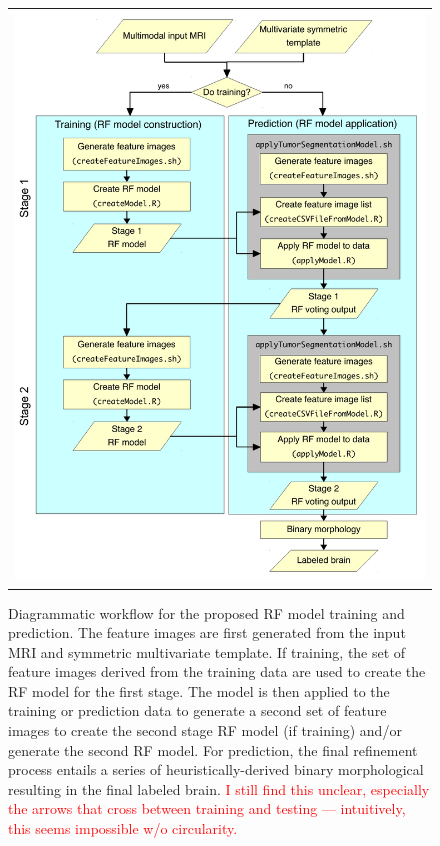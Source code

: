 \documentclass[preprint,authoryear,review,12pt]{elsarticle}
\begin{document}
\begin{figure}
  \centering
  \begin{tabular}{c}
    \includegraphics[width=110mm]{pipeline2.pdf}
  \end{tabular}
  \caption{Diagrammatic workflow for the proposed RF model training and prediction.  The feature
  images are first generated from the input MRI and symmetric multivariate template. If training,
  the set of feature images derived from the training data are used to create the RF model
  for the first stage.  The model is then applied to the training or prediction data to generate 
  a second set of feature images to create the second stage RF model (if training) and/or generate
  the second RF model.  
  For prediction, the final refinement process entails a series of heuristically-derived
  binary morphological resulting in the final labeled brain.
  \textcolor{red}{I still find this unclear, especially the arrows
    that cross between training and testing --- intuitively, this
    seems impossible w/o circularity.}
  }
  \label{fig:pipeline}
\end{figure}
\end{document}
